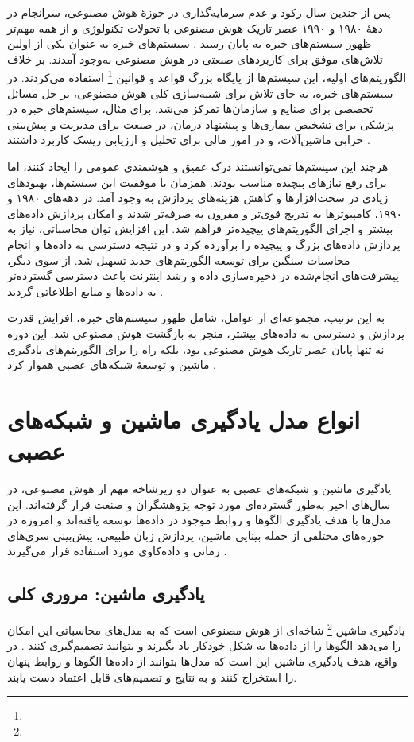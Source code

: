 پس از چندین سال رکود و عدم سرمایه‌گذاری در حوزهٔ هوش مصنوعی، سرانجام در دههٔ ۱۹۸۰ و ۱۹۹۰ عصر تاریک هوش مصنوعی با تحولات تکنولوژی و از همه مهم‌تر ظهور سیستم‌های خبره به پایان رسید \cite{feigenbaum1983handbook}. سیستم‌های خبره به عنوان یکی از اولین تلاش‌های موفق برای کاربردهای صنعتی در هوش مصنوعی به‌وجود آمدند. بر خلاف الگوریتم‌های اولیه، این سیستم‌ها از پایگاه بزرگ قواعد و قوانین \footnote{} استفاده می‌کردند. در سیستم‌های خبره، به جای تلاش برای شبیه‌سازی کلی هوش مصنوعی، بر حل مسائل تخصصی برای صنایع و سازمان‌ها تمرکز می‌شد. برای مثال، سیستم‌های خبره در پزشکی برای تشخیص بیماری‌ها و پیشنهاد درمان، در صنعت برای مدیریت و پیش‌بینی خرابی ماشین‌آلات، و در امور مالی برای تحلیل و ارزیابی ریسک کاربرد داشتند \cite{mccorduck2004machines}.

هرچند این سیستم‌ها نمی‌توانستند درک عمیق و هوشمندی عمومی را ایجاد کنند، اما برای رفع نیازهای پیچیده مناسب بودند. همزمان با موفقیت این سیستم‌ها، بهبودهای زیادی در سخت‌افزارها و کاهش هزینه‌های پردازش به وجود آمد. در دهه‌های ۱۹۸۰ و ۱۹۹۰، کامپیوترها به تدریج قوی‌تر و مقرون به صرفه‌تر شدند و امکان پردازش داده‌های بیشتر و اجرای الگوریتم‌های پیچیده‌تر فراهم شد. این افزایش توان محاسباتی، نیاز به پردازش داده‌های بزرگ و پیچیده را برآورده کرد و در نتیجه دسترسی به داده‌ها و انجام محاسبات سنگین برای توسعه الگوریتم‌های جدید تسهیل شد. از سوی دیگر، پیشرفت‌های انجام‌شده در ذخیره‌سازی داده و رشد اینترنت باعث دسترسی گسترده‌تر به داده‌ها و منابع اطلاعاتی گردید \cite{nilsson2010quest}.

به این ترتیب، مجموعه‌ای از عوامل، شامل ظهور سیستم‌های خبره، افزایش قدرت پردازش و دسترسی به داده‌های بیشتر، منجر به بازگشت هوش مصنوعی شد. این دوره نه تنها پایان عصر تاریک هوش مصنوعی بود، بلکه راه را برای الگوریتم‌های یادگیری ماشین و توسعهٔ شبکه‌های عصبی هموار کرد \cite{russell2016artificial}.


\section{انواع مدل یادگیری ماشین و شبکه‌های عصبی}\label{sec:ml-types}
یادگیری ماشین و شبکه‌های عصبی به عنوان دو زیرشاخه مهم از هوش مصنوعی، در سال‌های اخیر به‌طور گسترده‌ای مورد توجه پژوهشگران و صنعت قرار گرفته‌اند. این مدل‌ها با هدف یادگیری الگوها و روابط موجود در داده‌ها توسعه یافته‌اند و امروزه در حوزه‌های مختلفی از جمله بینایی ماشین، پردازش زبان طبیعی، پیش‌بینی سری‌های زمانی و داده‌کاوی مورد استفاده قرار می‌گیرند \cite{bishop2006pattern,mitchell1997machine,murphy2012machine}.

\subsection{یادگیری ماشین: مروری کلی}
یادگیری ماشین \footnote{} شاخه‌ای از هوش مصنوعی است که به مدل‌های محاسباتی این امکان را می‌دهد الگوها را از داده‌ها به شکل خودکار یاد بگیرند و بتوانند تصمیم‌گیری کنند
\cite{goodfellow2016deep,mitchell1997machine}.
در واقع، هدف یادگیری ماشین این است که مدل‌ها بتوانند از داده‌ها الگوها و روابط پنهان را استخراج کنند و به نتایج و تصمیم‌های قابل اعتماد دست یابند.

